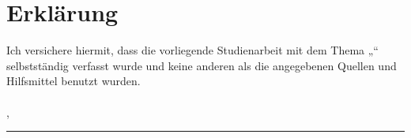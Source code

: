 
\chapter*{Erklärung}
Ich versichere hiermit, dass die vorliegende Studienarbeit mit dem Thema „\documentTitle“ selbstständig verfasst wurde und keine
anderen als die angegebenen Quellen und Hilfsmittel benutzt wurden.\\
\\
\releaseLocation, \releaseDate
\vspace{2em}

\rule{6cm}{0.4pt}\\
\documentAuthor
